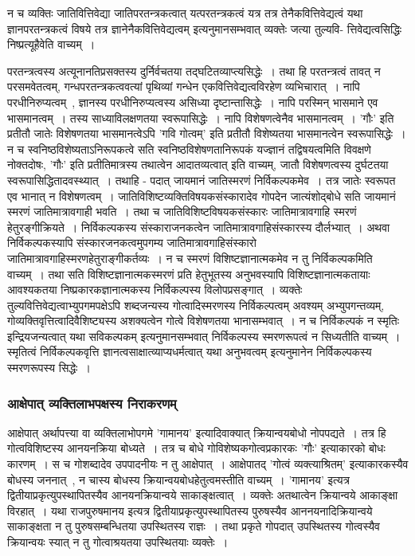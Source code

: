 				न च व्यक्तिः जातिवित्तिवेद्या जातिपरतन्त्रकत्वात् यत्परतन्त्रकत्वं यत्र तत्र तेनैकवित्तिवेद्यत्वं यथा ज्ञानपरतन्त्रकत्वं विषये तत्र ज्ञानेनैकवित्तिवेद्यत्वम् इत्यनुमानसम्भवात् व्यक्तेः जत्या तुल्यवि- त्तिवेद्यत्वसिद्धिः निष्प्रत्यूहैवेति वाच्यम्~।

				परतन्त्रत्वस्य अत्यूनानतिप्रसक्तस्य दुर्निर्वचतया तद्घटितव्याप्त्यसिद्धेः~। तथा हि परतन्त्रत्वं तावत् न परसमवेतत्वम्, गन्धपरतन्त्रकत्ववत्यां पृथिव्यां गन्धेन एकवित्तिवेद्यत्वविरहेण व्यभिचारात्~। नापि परधीनिरुप्यत्वम्~, ज्ञानस्य परधीनिरुप्यत्वस्य असिध्या दृष्टान्तासिद्धेः~। नापि परस्मिन् भासमाने एव भासमानत्वम्~। तस्य साध्याविलक्षणतया स्वरूपासिद्धेः~। नापि विशेषणत्वेनैव भासमानत्वम्~। 'गौः' इति प्रतीतौ जातेः विशेषणतया भासमानत्वेऽपि 'गवि गोत्वम्' इति प्रतीतौ विशेष्यतया भासमानत्वेन स्वरूपासिद्धेः~। न च स्वनिष्ठविशेष्यताऽनिरूपकत्वे सति स्वनिष्ठविशेषणतानिरूपकं यज्ज्ञानं तद्विषयत्वमिति विवक्षणे नोक्तदोषः, 'गौः' इति प्रतीतिमात्रस्य तथात्वेन आदातव्यत्वात् इति वाच्यम्, जातौ विशेषणत्वस्य दुर्घटतया स्वरूपासिद्धितादवस्थ्यात्~। तथाहि - पदात् जायमानं जातिस्मरणं निर्विकल्पकमेव~। तत्र जातेः स्वरूपत एव भानात् न विशेषणत्वम्~। जातिविशिष्टव्यक्तिविषयकसंस्कारादेव गोपदेन जात्यंशोद्बोधे सति जायमानं स्मरणं जातिमात्रावगाही भवति~। तथा च जातिविशिष्टविषयकसंस्कारः जातिमात्रावगाहि स्मरणं हेतुरङ्गीक्रियते~। निर्विकल्पकस्य संस्काराजनकत्वेन जातिमात्रावगाहिसंस्कारस्य दौर्लभ्यात्~। अथवा निर्विकल्पकस्यापि संस्कारजनकत्वमुपगम्य जातिमात्रावगाहिसंस्कारो जातिमात्रावगाहिस्मरणहेतुराङ्गीकर्तव्यः~। न च स्मरणं विशिष्टज्ञानात्मकमेव न तु निर्विकल्पकमिति वाच्यम्~। तथा सति विशिष्टज्ञानात्मकस्मरणं प्रति हेतुभूतस्य अनुभवस्यापि विशिष्टज्ञानात्मकतायाः आवश्यकतया निष्प्रकारकज्ञानात्मकस्य निर्विकल्पस्य विलोपप्रसङ्गात्~। व्यक्तेः तुल्यवित्तिवेद्यत्वाभ्युपगमपक्षेऽपि शब्दजन्यस्य गोत्वादिस्मरणस्य निर्विकल्पत्वम् अवश्यम् अभ्युपगन्तव्यम्, गोव्यक्तिवृत्तित्वादिवैशिष्ट्यस्य अशक्यत्वेन गोत्वे विशेषणतया भानासम्भवात्~। न च निर्विकल्पकं न स्मृतिः इन्द्रियजन्यत्वात् यथा सविकल्पकम् इत्यनुमानसम्भवात् निर्विकल्पस्य स्मरणरूपत्वं न सिध्यतीति वाच्यम्~। स्मृतित्वं निर्विकल्पकवृत्ति ज्ञानत्वसाक्षात्व्याप्यधर्मत्वात् यथा अनुभवत्वम् इत्यनुमानेन निर्विकल्पकस्य स्मरणरूपस्य सिद्धेः~।

			\subsubsection{आक्षेपात् व्यक्तिलाभपक्षस्य निराकरणम्}

				आक्षेपात् अर्थापत्त्या वा व्यक्तिलाभोपगमे 'गामानय' इत्यादिवाक्यात् क्रियान्वयबोधो नोपपद्यते~। तत्र हि गोत्वविशिष्टस्य आनयनक्रिया बोध्यते~। तत्र च बोधे गोविशेष्यकगोत्वप्रकारकः 'गौः' इत्याकारको बोधः कारणम्~। स च गोशब्दादेव उपपादनीयः न तु आक्षेपात्~। आक्षेपातद् 'गोत्वं व्यक्त्याश्रितम्' इत्याकारकस्यैव बोधस्य जननात्~,  न चास्य बोधस्य क्रियान्वयबोधहेतुत्वमस्तीति वाच्यम्~। 'गामानय' इत्यत्र द्वितीयाप्रकृत्युपस्थापितस्यैव आनयनक्रियान्वये साकाङ्क्षत्वात्~। व्यक्तेः अतथात्वेन क्रियान्वये आकाङ्क्षा विरहात्~। यथा राजपुरुषमानय इत्यत्र  द्वितीयाप्रकृत्युपस्थापितस्य पुरुषस्यैव आननयनादिक्रियान्वये साकाङ्क्षता न तु पुरुषसम्बन्धितया उपस्थितस्य राज्ञः~। तथा प्रकृते गोपदात् उपस्थितस्य गोत्वस्यैव क्रियान्वयः स्यात् न तु गोत्वाश्रयतया उपस्थितयाः व्यक्तेः~।

